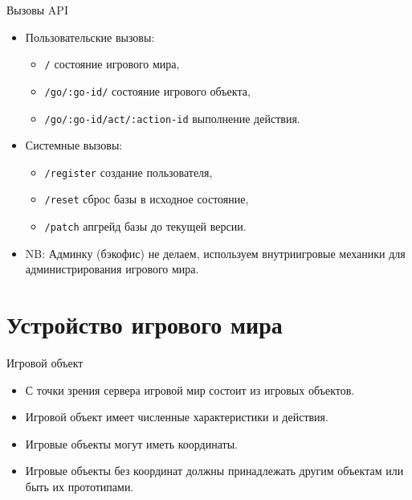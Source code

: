 \documentclass[aspectratio=169,handout,bigger]{beamer}
\begin{document}
\begin{frame}{Вызовы API}
  \begin{itemize}
    \item Пользовательские вызовы:
      \begin{itemize}
        \item \texttt{/} состояние игрового мира,
        \item \texttt{/go/:go-id/} состояние игрового объекта,
        \item \texttt{/go/:go-id/act/:action-id} выполнение действия.
      \end{itemize}
    \item Системные вызовы:
    \begin{itemize}
      \item \texttt{/register} создание пользователя,
      \item \texttt{/reset} сброс базы в исходное состояние,
      \item \texttt{/patch} апгрейд базы до текущей версии.
    \end{itemize}
    \item NB: Админку (бэкофис) не делаем,
          используем внутриигровые механики для администрирования игрового мира.
  \end{itemize}
\end{frame}


\section{Устройство игрового мира}


\begin{frame}{Игровой объект}
  \begin{itemize}
    \item С точки зрения сервера игровой мир состоит из игровых объектов.
    \item Игровой объект имеет численные характеристики и действия.
    \item Игровые объекты могут иметь координаты.
    \item Игровые объекты без координат должны принадлежать другим объектам
          или быть их прототипами.
  \end{itemize}
\end{frame}
\end{document}
